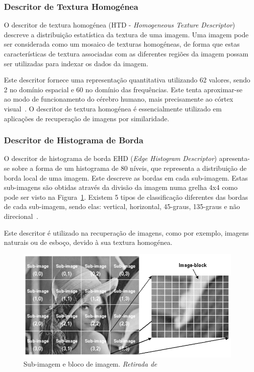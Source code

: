 \subsubsection{Descritor de Textura Homogénea}

O descritor de textura homogénea (HTD - \textit{Homogeneous Texture Descriptor}) descreve a distribuição estatística da textura de uma imagem. Uma imagem pode ser considerada como um mosaico de texturas homogéneas, de forma que estas características de textura associadas com as diferentes regiões da imagem possam ser utilizadas para indexar os dados da imagem.

Este descritor fornece uma representação quantitativa utilizando 62 valores, sendo 2 no domínio espacial e 60 no domínio das frequências. Este tenta aproximar-se ao modo de funcionamento do cérebro humano, mais precisamente ao córtex visual~\cite{Wu2001, Shao2009}.%
O descritor de textura homogénea é essencialmente utilizado em aplicações de recuperação de imagens por similaridade. 


\subsubsection{Descritor de Histograma de Borda}

O descritor de histograma de borda EHD (\textit{Edge Histogram Descriptor}) apresenta-se sobre a forma de um histograma de 80 níveis, que representa a distribuição de borda local de uma imagem. Este descreve as bordas em cada sub-imagem. Estas sub-imagens são obtidas através da divisão da imagem numa grelha 4x4 como pode ser visto na Figura~\ref{fig:ehd}. Existem 5 tipos de classificação diferentes das bordas de cada sub-imagem, sendo elas: vertical, horizontal, 45-graus, 135-graus e não direcional~\cite{Wu2001}. 

Este descritor é utilizado na recuperação de imagens, como por exemplo, imagens naturais ou de esboço, devido à sua textura homogénea. %

\begin{figure}[h]
\centering
\includegraphics[width=0.7\linewidth]{./figures/ehd}
\caption{Sub-imagem e bloco de imagem. \textit{Retirada de}~\cite{Wu2001}}
\label{fig:ehd}
\end{figure}

